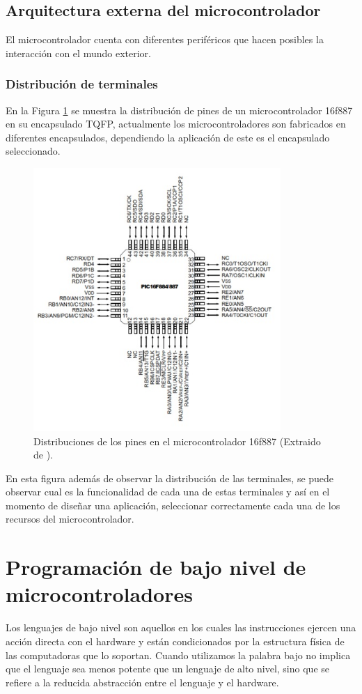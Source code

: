 \documentclass[12pt,a4paper]{article}
\begin{document}
   \subsection{Arquitectura externa del microcontrolador}
   El microcontrolador cuenta con diferentes periféricos que hacen posibles la interacción con el mundo exterior.
   
   \subsubsection{Distribución de terminales}
   
   En la Figura \ref{fig:TQFP} se muestra la distribución de pines de un microcontrolador 16f887 en su encapsulado TQFP, actualmente los microcontroladores son fabricados en diferentes encapsulados, dependiendo la aplicación de este es el encapsulado seleccionado.\\ 
   
   
   \begin{figure}[htpb]
   \centering
   \includegraphics[height=10cm]{TQFP}
   \caption{Distribuciones de los pines en el microcontrolador 16f887 (Extraido de \cite{PIC}).}
   \label{fig:TQFP}
   \end{figure}
   
   En esta figura además de observar la distribución de las terminales, se puede observar cual es la funcionalidad de cada una de estas terminales y así en el momento de diseñar una aplicación, seleccionar correctamente cada una de los recursos del microcontrolador.
   
   \newpage
   \section{Programación de bajo nivel de microcontroladores}
   Los lenguajes de bajo nivel son aquellos en los cuales las instrucciones ejercen una acción directa con el hardware y están condicionados por la estructura física de las computadoras que lo soportan. Cuando utilizamos la palabra bajo no implica que el lenguaje sea menos potente que un lenguaje de alto nivel, sino que se refiere a la reducida abstracción entre el lenguaje y el hardware\cite{Muha}. \\
   
\end{document}
